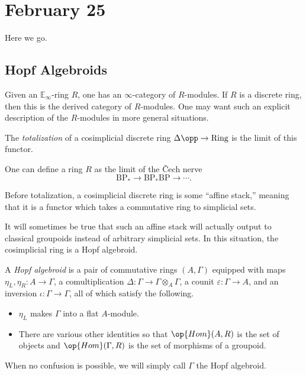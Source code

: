 \documentclass[../notes.tex]{subfiles}
\begin{document}
\section{February 25}
Here we go.

\subsection{Hopf Algebroids}
Given an $\mathbb E_\infty$-ring $R$, one has an $\infty$-category of $R$-modules. If $R$ is a discrete ring, then this is the derived category of $R$-modules. One may want such an explicit description of the $R$-modules in more general situations.
\begin{definition}[totalization]
	The \textit{totalization} of a cosimplicial discrete ring $\Delta\opp\to\mathrm{Ring}$ is the limit of this functor.
\end{definition}
\begin{example}
	One can define a ring $R$ as the limit of the \v{C}ech nerve
	\[\mathrm{BP}_*\to\mathrm{BP}_*\mathrm{BP}\to\cdots.\]
\end{example}
\begin{remark}
	Before totalization, a cosimplicial discrete ring is some ``affine stack,'' meaning that it is a functor which takes a commutative ring to simplicial sets.
\end{remark}
It will sometimes be true that such an affine stack will actually output to classical groupoids instead of arbitrary simplicial sets. In this situation, the cosimplicial ring is a Hopf algebroid.
\begin{definition}
	A \textit{Hopf algebroid} is a pair of commutative rings $(A,\Gamma)$ equipped with maps $\eta_L,\eta_R\colon A\to\Gamma$, a comultiplication $\Delta\colon\Gamma\to\Gamma\otimes_A\Gamma$, a counit $\varepsilon\colon\Gamma\to A$, and an inversion $\iota\colon\Gamma\to\Gamma$, all of which satisfy the following.
	\begin{itemize}
		\item $\eta_L$ makes $\Gamma$ into a flat $A$-module.
		\item There are various other identities so that $\op{Hom}(A,R)$ is the set of objects and $\op{Hom}(\Gamma,R)$ is the set of morphisms of a groupoid.
	\end{itemize}
	When no confusion is possible, we will simply call $\Gamma$ the Hopf algebroid.
\end{definition}
\end{document}
